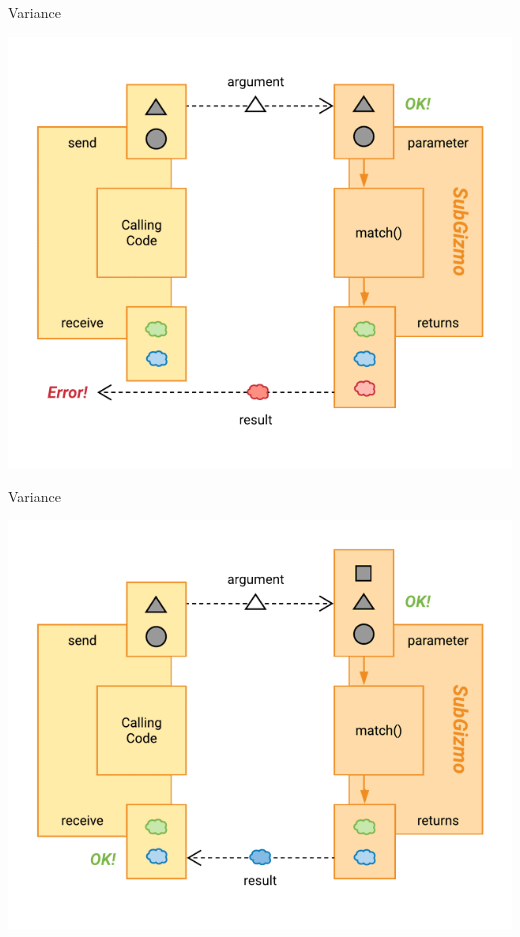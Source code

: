 \documentclass[xcolor=pdftex,dvipsnames,table]{beamer}
\begin{document}
\begin{frame}{Variance}
  \begin{center}
    \includegraphics[height=0.9\textheight,keepaspectratio]{images/function-call-error-out}
  \end{center}
\end{frame}

\begin{frame}{Variance}
  \begin{center}
    \includegraphics[height=0.9\textheight,keepaspectratio]{images/function-call-ok-contravariance}
  \end{center}
\end{frame}
\end{document}
